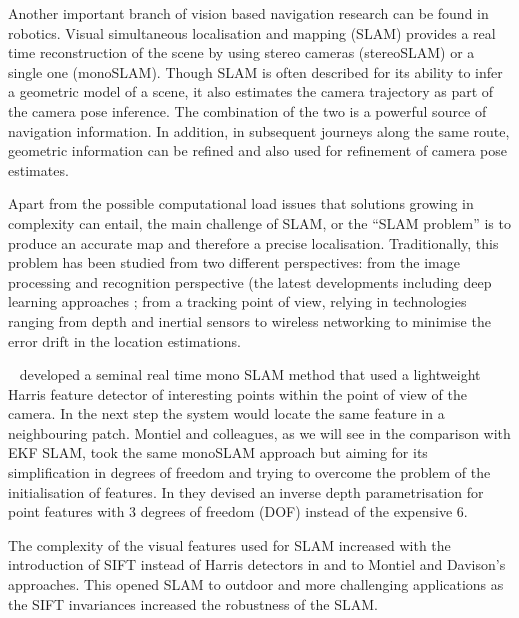 Another important branch of vision based navigation research can be found in robotics. Visual simultaneous localisation and mapping (SLAM) \citep{konolige2007frame,engelhard2011real,neira2008guest} provides a real time reconstruction of the scene by using stereo cameras (stereoSLAM) or a single one (monoSLAM). Though SLAM is often described for its ability to infer a geometric model of a scene, it also estimates the camera trajectory as part of the camera pose inference. The combination of the two is a powerful source of navigation information. In addition, in subsequent journeys along the same route, geometric information can be refined and also used for refinement of camera pose estimates.

Apart from the possible computational load issues that solutions growing in complexity can entail, the main challenge of SLAM, or the ``SLAM problem'' is to produce an accurate map and therefore a precise localisation. Traditionally, this problem has been studied from two different perspectives: from the image processing and recognition perspective (the latest developments including deep learning approaches \citep{chen2014convolutional}; from a tracking point of view, relying in technologies ranging from depth and inertial sensors to wireless networking to minimise the error drift in the location estimations.


\citeauthor{davison2007monoslam}~\cite{davison2007monoslam} developed a seminal real time mono SLAM method that used a lightweight Harris feature detector of interesting points within the point of view of the camera. In the next step the system would locate the same feature in a neighbouring patch. Montiel and colleagues, as we will see in the comparison with EKF SLAM, took the same monoSLAM approach but aiming for its simplification in degrees of freedom and trying to overcome the problem of the initialisation of features. In \citep{montiel2006unified} they devised an inverse depth parametrisation for point features with 3 degrees of freedom (DOF) instead of the expensive 6.

The complexity of the visual features used for SLAM increased with the introduction of SIFT instead of Harris detectors in \citep{chen2007sift} and \citep{suzuki2011development} to Montiel and Davison's approaches. This opened SLAM to outdoor and more challenging applications as the SIFT invariances increased the robustness of the SLAM.

